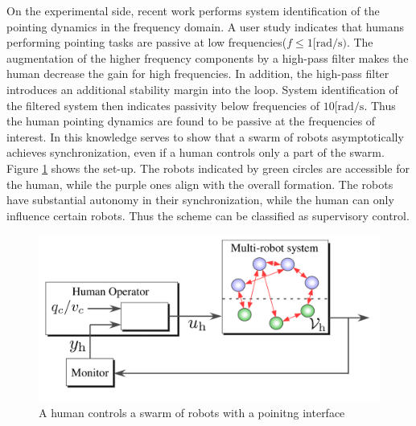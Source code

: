 \documentclass[a4paper,twoside, openright,12pt]{report}
\begin{document}
On the experimental side, recent work \cite{Hatanaka2015} performs system identification of the pointing dynamics in the frequency domain. A user study indicates that humans performing pointing tasks are passive at low frequencies($f\leq 1 \text{[rad/s})$. The augmentation of the higher frequency components by a high-pass filter makes the human decrease the gain for high frequencies. In addition, the high-pass filter introduces an additional stability margin into the loop. System identification of the filtered system then indicates passivity below frequencies of $10 \text{[rad/s}$. Thus the human pointing dynamics are found to be passive at the frequencies of interest. In \cite{Hatanaka2015} this knowledge serves to show that a swarm of robots asymptotically achieves synchronization, even if a human controls only a part of the swarm. Figure \ref{FIG:HumanSwarm} shows the set-up. The robots indicated by green circles are accessible for the human, while the purple ones align with the overall formation. The robots have substantial autonomy in their synchronization, while the human can only influence certain robots. Thus the scheme can be classified as supervisory control.

\begin{figure}[b]
\centering
\includegraphics[width=0.65\linewidth]{HumanSwarm.png}
\caption[Human-robot swarm interaction with a pointing interface]{A human controls a swarm of robots with a poinitng interface \cite{Hatanaka2015}}
\label{FIG:HumanSwarm}
\end{figure}
\end{document}
